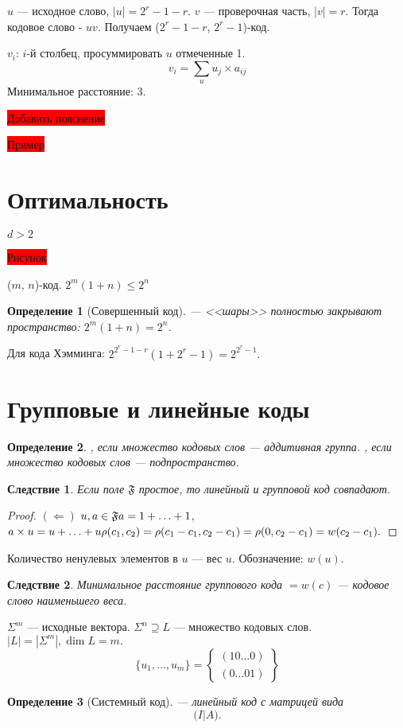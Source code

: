 \documentclass[a4paper,14pt, draft]{report}
\newtheorem{definition}{Определение}
\newtheorem{consequence}{Следствие}
\begin{document}
$u$ --- исходное слово, $|u| = 2^r-1-r$. $v$ --- проверочная часть, $|v| = r$. Тогда кодовое слово - $uv$. Получаем ($2^r-1-r$, $2^r-1$)-код.

$v_i$: $i$-й столбец, просуммировать $u$ отмеченные 1. $$v_i = \sum_u u_j\times a_{ij}$$
Минимальное расстояние: 3.

\colorbox{red}{Добавить пояснение}

\colorbox{red}{Пример}

\section{Оптимальность}

$d > 2$

\colorbox{red}{Рисунок}

($m$, $n$)-код. $2^m (1+n) \le 2^n$
\begin{definition}[Совершенный код]
 --- <<шары>> полностью закрывают пространство: $2^m (1+n) = 2^n$.
\end{definition}

Для кода Хэмминга: $2^{2^r-1-r}(1+2^r-1) = 2^{2^r-1}.$

\section{Групповые и линейные коды}
\begin{definition}
, если множество кодовых слов --- аддитивная группа. , если множество кодовых слов --- подпространство.
\end{definition}
\begin{consequence}Если поле $\mathfrak{F}$ простое, то линейный и групповой код совпадают.
\end{consequence}
\begin{proof}
$(\Leftarrow)$ $u, a \in\mathfrak{F}\\ a = 1+\ldots+1$, $a\times u = u+\ldots+u\\
\rho(c_1, c_2) = \rho(c_1-c_1, c_2-c_1)= \rho(0, c_2-c_1) = w(c_2-c_1).$
\end{proof}
Количество ненулевых элементов в $u$ --- вес $u$. Обозначение: $w(u)$.
\begin{consequence}Минимальное расстояние группового кода $=w(c)$ --- кодовое слово наименьшего веса.
\end{consequence}

$\Sigma^m$ --- исходные вектора. $\Sigma^n\supseteq L$ --- множество кодовых слов.\\$|L| = |\Sigma^m|, \dim L = m.$
\[\{u_1, \ldots, u_m\} = \begin{Bmatrix}(1 0 \ldots 0)\\(0 \ldots 0 1)\end{Bmatrix}\]

\begin{definition}[Системный код]
 --- линейный код с матрицей вида $$\big(I|A\big).$$
\end{definition}
\end{document}
